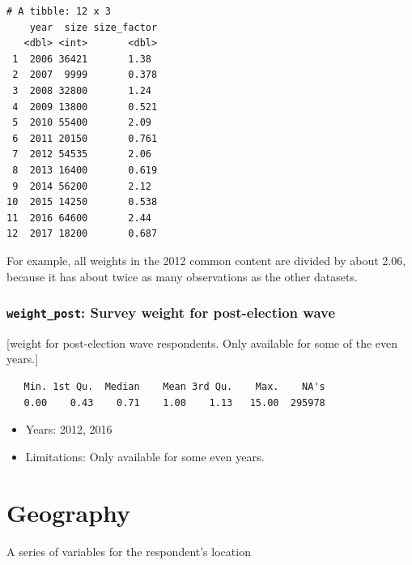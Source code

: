 \documentclass[10pt,article,oneside]{memoir}
\theoremstyle{definition}
\begin{document}
\begin{verbatim}
# A tibble: 12 x 3
    year  size size_factor
   <dbl> <int>       <dbl>
 1  2006 36421       1.38 
 2  2007  9999       0.378
 3  2008 32800       1.24 
 4  2009 13800       0.521
 5  2010 55400       2.09 
 6  2011 20150       0.761
 7  2012 54535       2.06 
 8  2013 16400       0.619
 9  2014 56200       2.12 
10  2015 14250       0.538
11  2016 64600       2.44 
12  2017 18200       0.687
\end{verbatim}

For example, all weights in the 2012 common content are divided by about
2.06, because it has about twice as many observations as the other
datasets.

\hypertarget{weight_post-survey-weight-for-post-election-wave}{%
\subsubsection{\texorpdfstring{\texttt{weight\_post}: Survey weight for
post-election
wave}{weight\_post: Survey weight for post-election wave}}\label{weight_post-survey-weight-for-post-election-wave}}

{[}weight for post-election wave respondents. Only available for some of
the even years.{]}

\begin{verbatim}
   Min. 1st Qu.  Median    Mean 3rd Qu.    Max.    NA's 
   0.00    0.43    0.71    1.00    1.13   15.00  295978 
\end{verbatim}

\begin{itemize}
\tightlist
\item
  Years: 2012, 2016
\item
  Limitations: Only available for some even years.
\end{itemize}

\hypertarget{geography}{%
\section{Geography}\label{geography}}

A series of variables for the respondent's location
\end{document}

